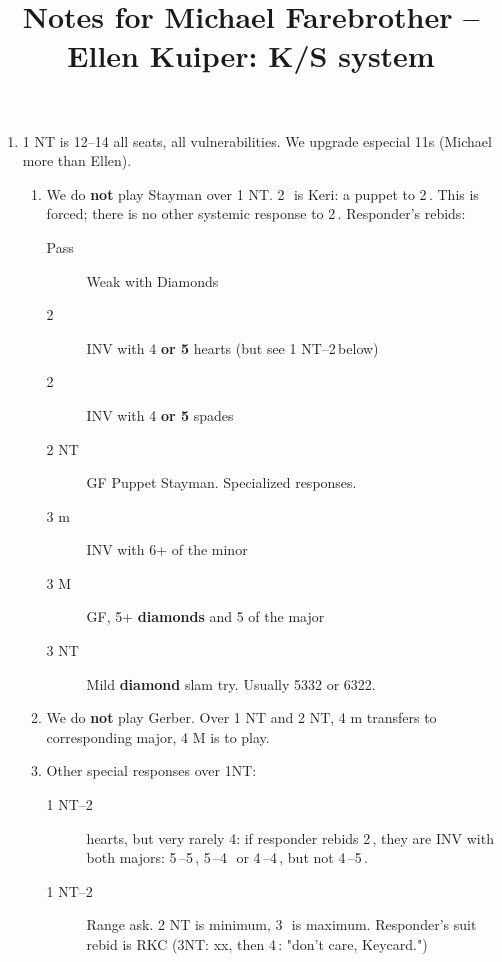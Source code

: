 \documentclass[12pt,twocolumn]{article}
\title{Notes for Michael Farebrother -- Ellen Kuiper: K/S system}
\begin{document}
    \maketitle
\begin{scriptsize}
    \begin{enumerate}
        \item 1 NT is 12--14 all seats, all vulnerabilities.
         We upgrade especial 11s (Michael more than Ellen).
        \begin{enumerate}[label*=\arabic*.,nosep]
            \item We do \textbf{not} play Stayman over 1 NT.  2\,\bc\ is Keri: a puppet to 2\,\rd.
            This is forced; there is no other systemic response to 2\,\bc.
            Responder's rebids:
            \begin{description}
                \item [Pass] Weak with Diamonds
                \item [2\,\rh] INV with 4 \textbf{or 5} hearts (but see 1 NT--2\,\rd below)
                \item [2\,\bs] INV with 4 \textbf{or 5} spades
                \item [2 NT] GF Puppet Stayman.
                 Specialized responses.
                \item [3 m] INV with 6+ of the minor
                \item [3 M] GF, 5+ \textbf{diamonds} and 5 of the major
                \item [3 NT] Mild \textbf{diamond} slam try.
                 Usually 5332 or 6322.
            \end{description}
            \item We do \textbf{not} play Gerber.
            Over 1 NT and 2 NT, 4 m transfers to corresponding major, 4 M is to play.
            \item Other special responses over 1NT:
            \begin{description}
                \item [1 NT--2\,\rd] hearts, but very rarely 4: if responder rebids 2\,\bs,
                      they are INV with both majors: 5\,\bs--5\,\rh, 5\,\bs--4\,\rh\ or 4\,\bs--4\,\rh, but not 4\,\bs--5\,\rh.
                \label{item:4-hearts}
                \item [1 NT--2\,\bs] Range ask.
                2 NT is minimum, 3\,\bc\ is maximum.
                Responder's suit rebid is RKC (3NT: xx, then 4\,\bc: "don't care, Keycard.")

\end{description}
\end{enumerate}
\end{enumerate}
\end{scriptsize}
\end{document}
